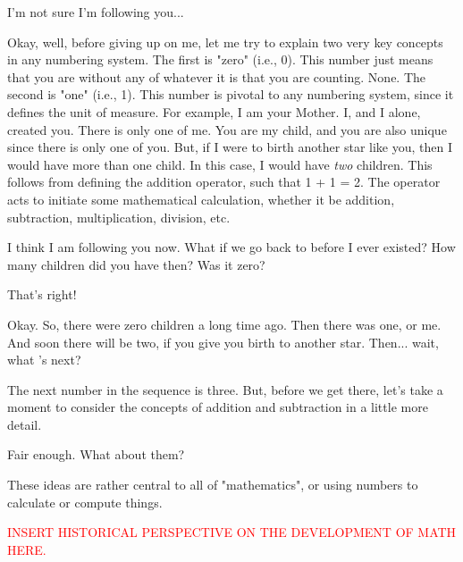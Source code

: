 \documentclass[main.tex]{subfiles}
\begin{document}
\par \Maia I'm not sure I'm following you...

\par \Pleione Okay, well, before giving up on me, let me try to explain two very key concepts in any numbering system.  The first is "zero" (i.e., 0).  This number just means that you are without any of whatever it is that you are counting.  None.  The second is "one" (i.e., 1).  This number is pivotal to any numbering system, since it defines the unit of measure.  For example, I am your Mother.  I, and I alone, created you.  There is only one of me.  You are my child, and you are also unique since there is only one of you.  But, if I were to birth another star like you, then I would have more than one child.  In this case, I would have \textit{two} children.  This follows from defining the addition operator, such that 1 + 1 = 2.  The operator acts to initiate some mathematical calculation, whether it be addition, subtraction, multiplication, division, etc.

\par \Maia I think I am following you now.  What if we go back to before I ever existed?  How many children did you have then?  Was it zero?

\par \Pleione That's right!

\par \Maia Okay.  So, there were zero children a long time ago.  Then there was one, or me.  And soon there will be two, if you give you birth to another star.  Then... wait, what 's next?

\par \Pleione The next number in the sequence is three.  But, before we get there, let's take a moment to consider the concepts of addition and subtraction in a little more detail.

\par \Maia Fair enough.  What about them?

\par \Pleione These ideas are rather central to all of "mathematics", or using numbers to calculate or compute things.

\begin{tcolorbox}[sharp corners, colback=red!30, colframe=red!80!blue, title=History of Mathematics]
\par \textcolor{red} {INSERT HISTORICAL PERSPECTIVE ON THE DEVELOPMENT OF MATH HERE.}
\end{tcolorbox}
\end{document}
